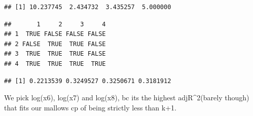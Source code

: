 \documentclass[
]{article}
\newenvironment{Shaded}{\begin{snugshade}}{\end{snugshade}}
\newcommand{\AttributeTok}[1]{\textcolor[rgb]{0.13,0.29,0.53}{#1}}
\newcommand{\DecValTok}[1]{\textcolor[rgb]{0.00,0.00,0.81}{#1}}
\newcommand{\FunctionTok}[1]{\textcolor[rgb]{0.13,0.29,0.53}{\textbf{#1}}}
\newcommand{\NormalTok}[1]{#1}
\newcommand{\OtherTok}[1]{\textcolor[rgb]{0.56,0.35,0.01}{#1}}
\newcommand{\SpecialCharTok}[1]{\textcolor[rgb]{0.81,0.36,0.00}{\textbf{#1}}}
\newcommand{\StringTok}[1]{\textcolor[rgb]{0.31,0.60,0.02}{#1}}
\begin{document}
\begin{Shaded}
\end{Shaded}

\begin{verbatim}
## [1] 10.237745  2.434732  3.435257  5.000000
\end{verbatim}

\begin{Shaded}
\end{Shaded}

\begin{verbatim}
##       1     2     3     4
## 1  TRUE FALSE FALSE FALSE
## 2 FALSE  TRUE  TRUE FALSE
## 3  TRUE  TRUE  TRUE FALSE
## 4  TRUE  TRUE  TRUE  TRUE
\end{verbatim}

\begin{Shaded}
\end{Shaded}

\begin{verbatim}
## [1] 0.2213539 0.3249527 0.3250671 0.3181912
\end{verbatim}

We pick log(x6), log(x7) and log(x8), bc its the highest
adjR\^{}2(barely though) that fits our mallows cp of being strictly less
than k+1.
\end{document}

